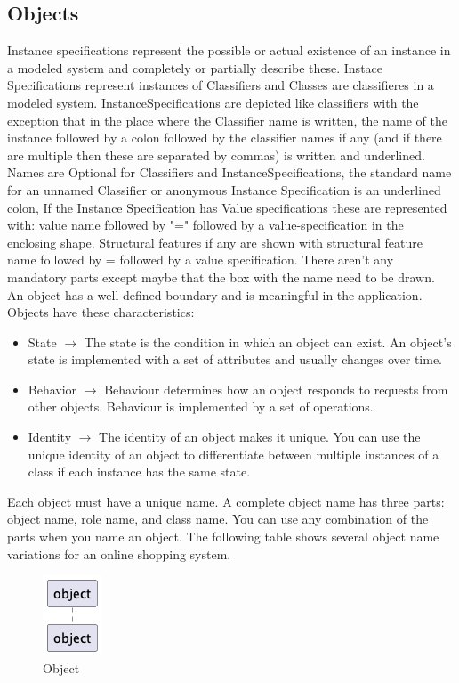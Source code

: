 \subsection{Objects}
Instance specifications represent the possible or actual existence of an instance in a modeled system and completely or partially describe these. Instace Specifications represent instances of Classifiers and Classes are classifieres in a modeled system. InstanceSpecifications are depicted like classifiers with the exception that in the place where the Classifier name is written, the name of the instance followed by a colon followed by the classifier names if any (and if there are multiple then these are separated by commas) is written and underlined. Names are Optional for Classifiers and InstanceSpecifications, the standard name for an unnamed Classifier or anonymous Instance Specification is an underlined colon, If the Instance Specification has Value specifications these are represented with: value name followed by "=" followed by a value-specification in the enclosing shape. Structural features if any are shown with structural feature name followed by = followed by a value specification. There aren't any mandatory parts except maybe that the box with the name need to be drawn.\\
 An object has a well-defined boundary and is meaningful in the application. Objects have these characteristics:
\begin{itemize}
	\item State $\rightarrow$ The state is the condition in which an object can exist. An object’s state is implemented with a set of attributes and usually changes over time.
	\item Behavior $\rightarrow$ Behaviour determines how an object responds to requests from other objects. Behaviour is implemented by a set of operations.
	\item Identity $\rightarrow$ The identity of an object makes it unique. You can use the unique identity of an object to differentiate between multiple instances of a class if each instance has the same state.
\end{itemize}
Each object must have a unique name. A complete object name has three parts: object name, role name, and class name. You can use any combination of the parts when you name an object. The following table shows several object name variations for an online shopping system. 
\begin{figure}[hbt]
\label{object}
  \centering\includegraphics{Immagini/test-2.png}
  \caption{Object}
\end{figure}


